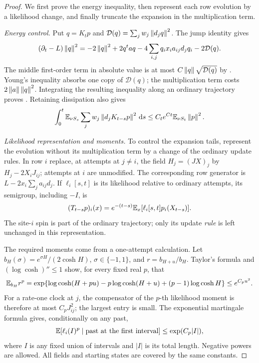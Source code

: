 \begin{proof}
We first prove the energy inequality, then represent each row evolution
by a likelihood change, and finally truncate the expansion in the
multiplication term.

\emph{Energy control.}
Put $q=K_tp$ and $\mathcal D(q)=\sum_jw_j\left\lVert d_jq\right\rVert^2$.
The jump identity gives
\[
 (\partial_t-L)\left\lVert q\right\rVert^2
 =-2\left\lVert q\right\rVert^2+2q^taq
   -4\sum_{i,j}q_ix_i a_{ij}d_jq_i-2\mathcal D(q).
\]
The middle first-order term in absolute value is at most
$C\left\lVert q\right\rVert\sqrt{\mathcal D(q)}$ by .
Young's inequality absorbs one copy of $\mathcal D(q)$; the
multiplication term costs $2\left\lVert a\right\rVert\left\lVert q\right\rVert^2$.
Integrating the resulting inequality along an ordinary trajectory
proves .  Retaining dissipation also gives
\[
 \int_0^t\mathbb E_{\nu S_s}\sum_jw_j
          \left\lVert d_jK_{t-s}p\right\rVert^2\,\mathrm d s
 \le C_te^{Ct}\mathbb E_{\nu S_t}\left\lVert p\right\rVert^2.
\]

\emph{Likelihood representation and moments.}
To control the expansion tails, represent the evolution without its
multiplication term by a change of the ordinary update rules.  In row $i$
replace, at attempts at $j\ne i$, the field $H_j=(JX)_j$ by
$H_j-2X_iJ_{ij}$; attempts at $i$ are unmodified.  The corresponding
row generator is $L-2x_i\sum_ja_{ij}d_j$.  If $\ell_i[s,t]$ is
its likelihood relative to ordinary attempts, its semigroup, including
$-I$, is
\[
 (T_{t-s}p)_i(x)=e^{-(t-s)}\mathbb E_x[\ell_i[s,t]p_i(X_{t-s})].
\]
The site-$i$ spin is part of the ordinary trajectory; only its update
\emph{rule} is left unchanged in this representation.

The required moments come from a one-attempt calculation.  Let
$b_H(\sigma)=e^{\sigma H}/(2\cosh H)$,
$\sigma\in\{-1,1\}$, and $r=b_{H+u}/b_H$.
Taylor's formula and $(\log\cosh)''\le1$ show, for every fixed
real $p$, that
\[
 \mathbb E_{b_H}r^p
 =\exp\{\log\cosh(H+pu)-p\log\cosh(H+u)
                    +(p-1)\log\cosh H\}
 \le e^{C_pu^2}.
\]
For a rate-one clock at $j$, the compensator of the $p$-th likelihood
moment is therefore at most $C_pJ_{ij}^2$; the largest entry is small.
The exponential martingale formula gives, conditionally on any past,
\begin{equation}
 \mathbb E[\ell_i(I)^p\mid\text{past at the first interval}]
 \le \exp(C_p|I|),
 \label{eq:path-likelihood-moment}
\end{equation}
where $I$ is any fixed union of intervals and $|I|$ is its total
length.  Negative powers are allowed.  All fields and starting states
are covered by the same constants.


\end{proof}
